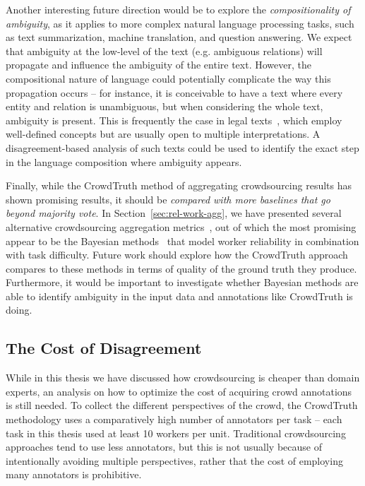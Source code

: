 Another interesting future direction would be to explore the \textit{compositionality of ambiguity}, as it applies to more complex natural language processing tasks, such as text summarization, machine translation, and question answering. We expect that ambiguity at the low-level of the text (e.g. ambiguous relations) will propagate and influence the ambiguity of the entire text. However, the compositional nature of language could potentially complicate the way this propagation occurs -- for instance, it is conceivable to have a text where every entity and relation is unambiguous, but when considering the whole text, ambiguity is present. This is frequently the case in legal texts~\cite{edelman1992legal}, which employ well-defined concepts but are usually open to multiple interpretations. A disagreement-based analysis of such texts could be used to identify the exact step in the language composition where ambiguity appears.

Finally, while the CrowdTruth method of aggregating crowdsourcing results has shown promising results, it should be \textit{compared with more baselines that go beyond majority vote}. In Section~\ref{sec:rel-work-agg}, we have presented several alternative crowdsourcing aggregation metrics~\cite{welinder2010multidimensional,werling2015job,NIPS2009_3644,Bozzon:2013,Kittur2008,Ipeirotis:2010}, out of which the most promising appear to be the Bayesian methods~\cite{paun2018comparing} that model worker reliability in combination with task difficulty. Future work should explore how the CrowdTruth approach compares to these methods in terms of quality of the ground truth they produce. Furthermore, it would be important to investigate whether Bayesian methods are able to identify ambiguity in the input data and annotations like CrowdTruth is doing.


\subsection{The Cost of Disagreement}

While in this thesis we have discussed how crowdsourcing is cheaper than domain experts, an analysis on how to optimize the cost of acquiring crowd annotations is still needed. To collect the different perspectives of the crowd, the CrowdTruth methodology uses a comparatively high number of annotators per task -- each task in this thesis used at least 10 workers per unit. Traditional crowdsourcing approaches tend to use less annotators, but this is not usually because of intentionally avoiding multiple perspectives, rather that the cost of employing many annotators is prohibitive.

